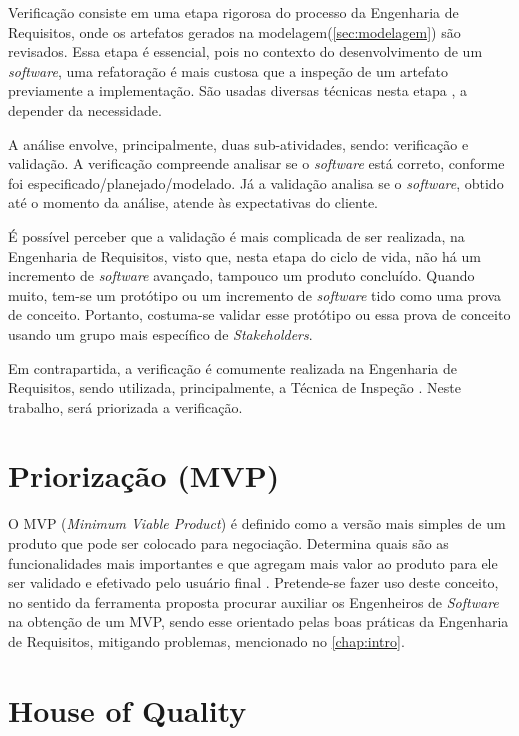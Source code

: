 \label{sec:verificacao}

Verificação consiste em uma etapa rigorosa do processo da Engenharia de Requisitos, onde os artefatos gerados na modelagem(\ref{sec:modelagem}) são revisados. Essa etapa é essencial, pois no contexto do desenvolvimento de um \textit{software}, uma refatoração é mais custosa que a inspeção de um artefato previamente a implementação. São usadas diversas técnicas nesta etapa \cite{verification}, a depender da necessidade.

A análise envolve, principalmente, duas sub-atividades, sendo: verificação e validação. A verificação compreende analisar  se o \textit{software} está correto, conforme foi especificado/planejado/modelado. Já a validação analisa se o \textit{software}, obtido até o momento da análise, atende às expectativas do cliente.

É possível perceber que a validação é mais complicada de ser realizada, na Engenharia de Requisitos, visto que, nesta etapa do ciclo de vida, não há um incremento de \textit{software} avançado, tampouco um produto concluído. Quando muito, tem-se um protótipo ou um incremento de \textit{software} tido como uma prova de conceito. Portanto, costuma-se validar esse protótipo ou essa prova de conceito usando um grupo mais específico de \textit{Stakeholders}.

Em contrapartida, a verificação é comumente realizada na Engenharia de Requisitos, sendo utilizada, principalmente, a Técnica de Inspeção \cite{design_fagan} \cite{verification_MR}. Neste trabalho, será priorizada a verificação.

\section{Priorização (MVP)}

\label{sec:priorizacao}

O MVP (\textit{Minimum Viable Product}) é definido como a versão mais simples de um produto que pode ser colocado para negociação. Determina quais são as funcionalidades mais importantes e que agregam mais valor ao produto para ele ser validado e efetivado pelo usuário final \cite{carolipaulo2018}. Pretende-se fazer uso deste conceito, no sentido da ferramenta proposta procurar auxiliar os Engenheiros de \textit{Software} na obtenção de um MVP, sendo esse orientado pelas boas práticas da Engenharia de Requisitos, mitigando problemas, mencionado no \autoref{chap:intro}.

\section{House of Quality}

